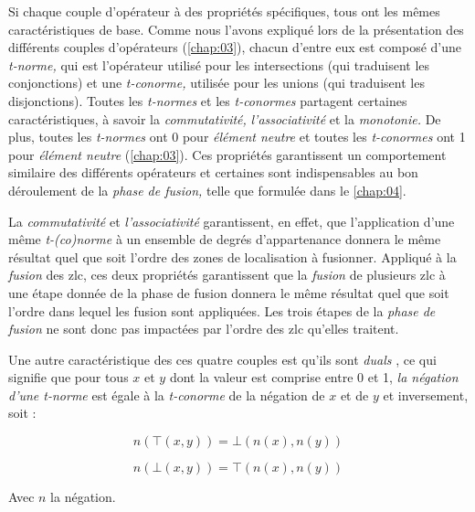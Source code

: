 Si chaque couple d'opérateur à des propriétés spécifiques, tous ont
les mêmes caractéristiques de base. Comme nous l'avons expliqué lors
de la présentation des différents couples d'opérateurs
(\autoref{chap:03}), chacun d'entre eux est composé d'une
\emph{t-norme,} qui est l'opérateur utilisé pour les intersections
(qui traduisent les conjonctions) et une \emph{t-conorme,} utilisée
pour les unions (qui traduisent les disjonctions). Toutes les
\emph{t-normes} et les \emph{t-conormes} partagent certaines
caractéristiques, à savoir la \emph{commutativité,}
\emph{l'associativité} et la \emph{monotonie.}  De plus, toutes les
\emph{t-normes} ont 0 pour \emph{élément neutre} et toutes les
\emph{t-conormes} ont 1 pour \emph{élément neutre}
(\autoref{chap:03}). Ces propriétés garantissent un comportement
similaire des différents opérateurs et certaines sont indispensables
au bon déroulement de la \emph{phase de fusion,} telle que formulée
dans le \autoref{chap:04}.

La \emph{commutativité} et \emph{l'associativité} garantissent, en
effet, que l’application d'une même \emph{t-(co)norme} à un ensemble
de degrés d'appartenance donnera le même résultat quel que soit
l'ordre des zones de localisation à fusionner. Appliqué à la
\emph{fusion} des \ac{zlc}, ces deux propriétés garantissent que la
\emph{fusion} de plusieurs \ac{zlc} à une étape donnée de la phase de
fusion donnera le même résultat quel que soit l'ordre dans lequel les
fusion sont appliquées. Les trois étapes de la \emph{phase de fusion}
ne sont donc pas impactées par l'ordre des \ac{zlc} qu'elles traitent.

Une autre caractéristique des ces quatre couples est qu'ils sont
\emph{duals} \autocite{Bouchon-Meunier2007}, ce qui signifie que pour
tous \(x\) et \(y\) dont la valeur est comprise entre 0 et 1, \emph{la
  négation d'une \emph{t-norme}} est égale à la \emph{t-conorme} de la
négation de \(x\) et de \(y\) et inversement, soit :

\begin{equation}
  n\left(⊤(x,y)\right) = ⊥\left(n(x), n(y)\right)
\end{equation}

\begin{equation}
  n\left(⊥(x,y)\right) = ⊤\left(n(x), n(y)\right)
\end{equation}

Avec \(n\) la négation.

